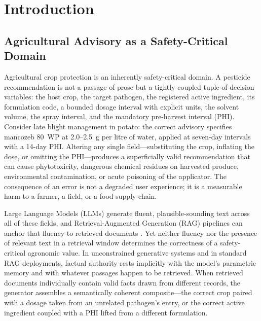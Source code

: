 \section{Introduction}
\label{sec:introduction}

\subsection{Agricultural Advisory as a Safety-Critical Domain}
Agricultural crop protection is an inherently safety-critical domain. A pesticide recommendation is not a passage of prose but a tightly coupled tuple of decision variables: the host crop, the target pathogen, the registered active ingredient, its formulation code, a bounded dosage interval with explicit units, the solvent volume, the spray interval, and the mandatory pre-harvest interval (PHI). Consider late blight management in potato: the correct advisory specifies mancozeb 80~WP at 2.0--2.5~g per litre of water, applied at seven-day intervals with a 14-day PHI. Altering any single field---substituting the crop, inflating the dose, or omitting the PHI---produces a superficially valid recommendation that can cause phytotoxicity, dangerous chemical residues on harvested produce, environmental contamination, or acute poisoning of the applicator. The consequence of an error is not a degraded user experience; it is a measurable harm to a farmer, a field, or a food supply chain.

Large Language Models (LLMs) generate fluent, plausible-sounding text across all of these fields, and Retrieval-Augmented Generation (RAG) pipelines can anchor that fluency to retrieved documents \citep{ragchecker2024, farmerchat2024}. Yet neither fluency nor the presence of relevant text in a retrieval window determines the correctness of a safety-critical agronomic value. In unconstrained generative systems and in standard RAG deployments, factual authority rests implicitly with the model's parametric memory and with whatever passages happen to be retrieved. When retrieved documents individually contain valid facts drawn from different records, the generator assembles a semantically coherent composite---the correct crop paired with a dosage taken from an unrelated pathogen's entry, or the correct active ingredient coupled with a PHI lifted from a different formulation.

